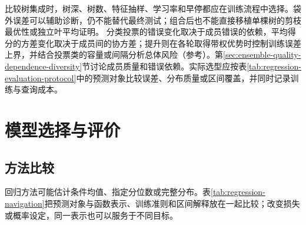 比较树集成时，树深、树数、特征抽样、学习率和早停都应在训练流程中选择。袋外误差可以辅助诊断，仍不能替代最终测试；组合后也不能直接移植单棵树的剪枝最优性或独立叶平均证明。
分类投票的错误变化取决于成员错误的依赖，平均得分的方差变化取决于成员间的协方差；提升则在各轮取得带权优势时控制训练误差上界，并结合投票类的容量或间隔分析总体风险（参考）。第\ref{sec:ensemble-quality-dependence-diversity}节讨论成员质量和错误依赖。实际选型应按表\ref{tab:regression-evaluation-protocol}中的预测对象比较误差、分布质量或区间覆盖，并同时记录训练与查询成本。

\section{模型选择与评价}
\label{sec:regression-evaluation}

\subsection{方法比较}

回归方法可能估计条件均值、指定分位数或完整分布。表\ref{tab:regression-navigation}把预测对象与函数表示、训练准则和区间解释放在一起比较；改变损失或概率设定，同一表示也可以服务于不同目标。

